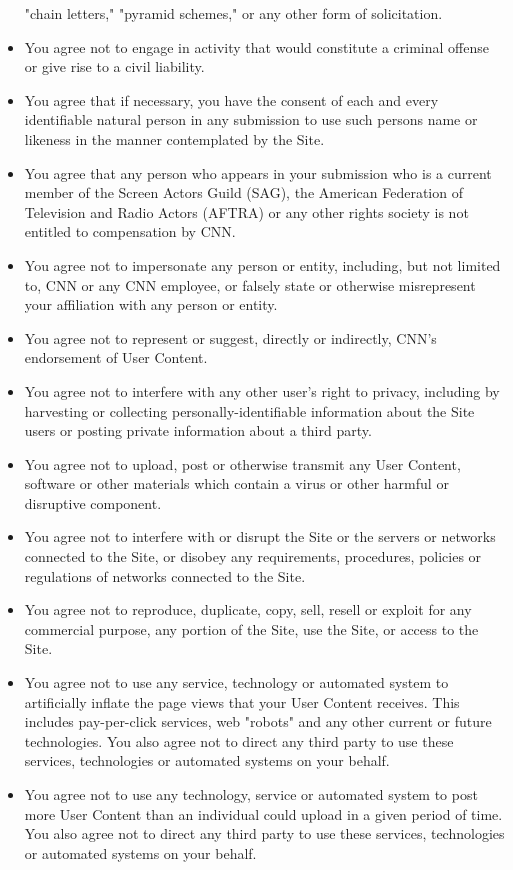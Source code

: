 \begin{itemize}
  "chain letters," "pyramid schemes," or any other form of solicitation.
\item
  You agree not to engage in activity that would constitute a criminal
  offense or give rise to a civil liability.
\item
  You agree that if necessary, you have the consent of each and every
  identifiable natural person in any submission to use such persons name
  or likeness in the manner contemplated by the Site.
\item
  You agree that any person who appears in your submission who is a
  current member of the Screen Actors Guild (SAG), the American
  Federation of Television and Radio Actors (AFTRA) or any other rights
  society is not entitled to compensation by CNN.
\item
  You agree not to impersonate any person or entity, including, but not
  limited to, CNN or any CNN employee, or falsely state or otherwise
  misrepresent your affiliation with any person or entity.
\item
  You agree not to represent or suggest, directly or indirectly, CNN's
  endorsement of User Content.
\item
  You agree not to interfere with any other user's right to privacy,
  including by harvesting or collecting personally-identifiable
  information about the Site users or posting private information about
  a third party.
\item
  You agree not to upload, post or otherwise transmit any User Content,
  software or other materials which contain a virus or other harmful or
  disruptive component.
\item
  You agree not to interfere with or disrupt the Site or the servers or
  networks connected to the Site, or disobey any requirements,
  procedures, policies or regulations of networks connected to the Site.
\item
  You agree not to reproduce, duplicate, copy, sell, resell or exploit
  for any commercial purpose, any portion of the Site, use the Site, or
  access to the Site.
\item
  You agree not to use any service, technology or automated system to
  artificially inflate the page views that your User Content receives.
  This includes pay-per-click services, web "robots" and any other
  current or future technologies. You also agree not to direct any third
  party to use these services, technologies or automated systems on your
  behalf.
\item
  You agree not to use any technology, service or automated system to
  post more User Content than an individual could upload in a given
  period of time. You also agree not to direct any third party to use
  these services, technologies or automated systems on your behalf.
\end{itemize}

